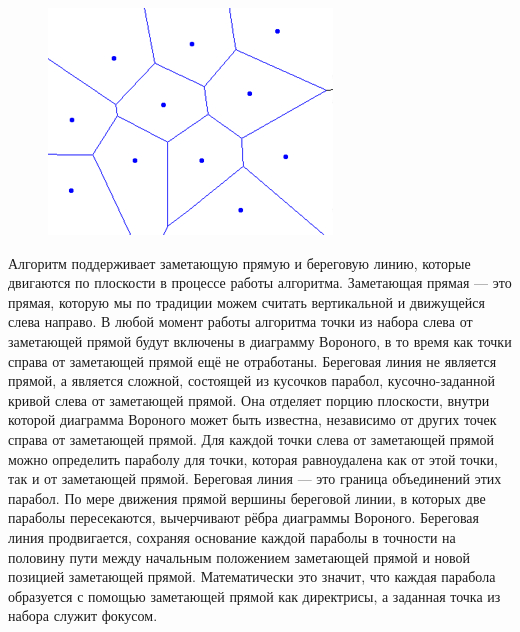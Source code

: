 \begin{figure}[H]
\begin{center}
\begin{minipage}[h]{0.3\linewidth}
            \includegraphics[width=1\linewidth]{fortunes-algo-21.jpg}
        \end{minipage}
    \end{center}
\end{figure}

Алгоритм поддерживает заметающую прямую и береговую линию, которые двигаются по плоскости в процессе работы алгоритма. Заметающая прямая — это прямая, которую мы по традиции можем считать вертикальной и движущейся слева направо. В любой момент работы алгоритма точки из набора слева от заметающей прямой будут включены в диаграмму Вороного, в то время как точки справа от заметающей прямой ещё не отработаны. Береговая линия не является прямой, а является сложной, состоящей из кусочков парабол, кусочно-заданной кривой слева от заметающей прямой. Она отделяет порцию плоскости, внутри которой диаграмма Вороного может быть известна, независимо от других точек справа от заметающей прямой. Для каждой точки слева от заметающей прямой можно определить параболу для точки, которая равноудалена как от этой точки, так и от заметающей прямой. Береговая линия — это граница объединений этих парабол. По мере движения прямой вершины береговой линии, в которых две параболы пересекаются, вычерчивают рёбра диаграммы Вороного. Береговая линия продвигается, сохраняя основание каждой параболы в точности на половину пути между начальным положением заметающей прямой и новой позицией заметающей прямой. Математически это значит, что каждая парабола образуется с помощью заметающей прямой как директрисы, а заданная точка из набора служит фокусом.

